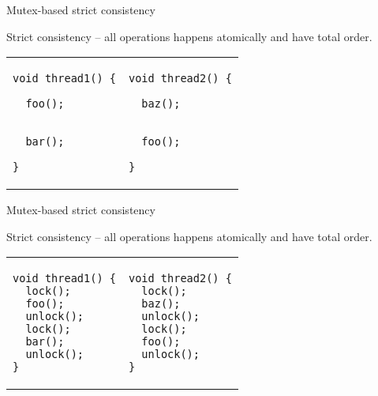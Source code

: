\begin{frame}{Mutex-based strict consistency}

Strict consistency -- all operations happens atomically and have total order.

\begin{tabular}{p{} p{}}

\begin{verbatim}
void thread1() {

  foo();
  

  bar();

}
\end{verbatim}

&

\begin{verbatim}
void thread2() {

  baz();
  

  foo();

}
\end{verbatim}

\end{tabular}

\end{frame}

\begin{frame}{Mutex-based strict consistency}

Strict consistency -- all operations happens atomically and have total order.
\begin{tabular}{p{} p{}}

\begin{verbatim}
void thread1() {
  lock();
  foo();
  unlock();
  lock();
  bar();
  unlock();
}
\end{verbatim}

&

\begin{verbatim}
void thread2() {
  lock();
  baz();
  unlock();
  lock();
  foo();
  unlock();
}
\end{verbatim}

\end{tabular}

\end{frame}


